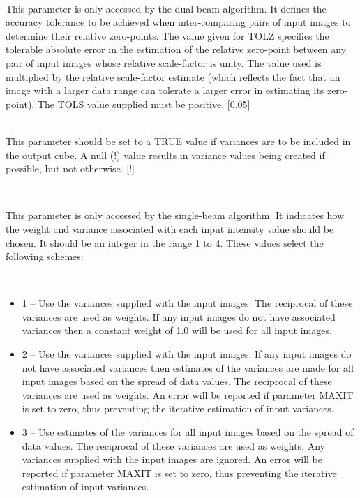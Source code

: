 \documentclass[twoside,11pt]{article}
\renewcommand{\_}{\texttt{\symbol{95}}}
\newcommand{\sstsubsection}[1]{ \item[{#1}] \mbox{} \\}
\newcommand{\sstitemlist}[1]{
  \mbox{} \\
  \vspace{-3.5ex}
  \begin{itemize}
     #1
  \end{itemize}
}
\newcommand{\sstitem}{\item}
\newcommand{\sstsubsection}[1]{\item[{#1}]}
\newcommand{\sstitemlist}[1]{
      \begin{itemize}
         #1
      \end{itemize}
      \\
   }
\newcommand{\sstitem}{\item}
\begin{document}
{{{      }
      \sstsubsection{
         TOLZ = \_REAL (Read)
      }{
         This parameter is only accessed by the dual-beam algorithm. It
         defines the accuracy tolerance to be achieved when inter-comparing
         pairs of input images to determine their relative zero-points. The
         value given for TOLZ specifies the tolerable absolute error in the
         estimation of the relative zero-point between any pair of input
         images whose relative scale-factor is unity. The value used is
         multiplied by the relative scale-factor estimate (which reflects the
         fact that an image with a larger data range can tolerate a larger
         error in estimating its zero-point). The TOLS value supplied must
         be positive. [0.05]
      }
      \sstsubsection{
         VARIANCE = \_LOGICAL (Read)
      }{
         This parameter should be set to a TRUE value if variances are to
         be included in the output cube. A null (!) value results in variance
         values being created if possible, but not otherwise. [!]
      }
      \sstsubsection{
         WEIGHTS = \_INTEGER (Read)
      }{
         This parameter is only accessed by the single-beam algorithm. It
         indicates how the weight and variance associated with each input
         intensity value should be chosen. It should be an integer in the
         range 1 to 4. These values select the following schemes:

         \sstitemlist{

            \sstitem
            1 -- Use the variances supplied with the input images. The
            reciprocal of these variances are used as weights. If any input
            images do not have associated variances then a constant weight of
            1.0 will be used for all input images.

            \sstitem
            2 -- Use the variances supplied with the input images. If any
            input images do not have associated variances then estimates of
            the variances are made for all input images based on the spread of
            data values. The reciprocal of these variances are used as weights.
            An error will be reported if parameter MAXIT is set to zero, thus
            preventing the iterative estimation of input variances.

            \sstitem
            3 -- Use estimates of the variances for all input images based
            on the spread of data values. The reciprocal of these variances
            are used as weights. Any variances supplied with the input images
            are ignored. An error will be reported if parameter MAXIT is set to
            zero, thus preventing the iterative estimation of input variances.

}}}}
\end{document}
